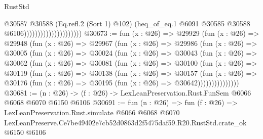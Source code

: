 \begin{lexlean}{RustStd}
\begin{coremodule}
                                          @30587
                                            @30588
                                            (Eq.refl.{2} (Sort 1) @102)
                                            (heq_of_eq.{1}
                                              @6091
                                              @30585
                                              @30588
                                              @6106)))))))))))))))))))))
@30673 := fun (x : @26) =>
  @29929
    (fun (x : @26) =>
    @29948
      (fun (x : @26) =>
      @29967
        (fun (x : @26) =>
        @29986
          (fun (x : @26) =>
          @30005
            (fun (x : @26) =>
            @30024
              (fun (x : @26) =>
              @30043
                (fun (x : @26) =>
                @30062
                  (fun (x : @26) =>
                  @30081
                    (fun (x : @26) =>
                    @30100
                      (fun (x : @26) =>
                      @30119
                        (fun (x : @26) =>
                        @30138
                          (fun (x : @26) =>
                          @30157
                            (fun (x : @26) =>
                            @30176 (fun (x : @26) => @30195 (fun (x : @26) => @30642)))))))))))))))
@30681 := (n : @26) -> (f : @26) -> LexLeanPreservation.Rust.FunSem @6066 @6068 @6070 @6150 @6106
@30691 := fun (n : @26) =>
  fun (f : @26) =>
  LexLeanPreservation.Rust.simulate
    @6066
    @6068
    @6070
    LexLeanPreserve.Ce7be49402e7cb52d0863d2f5475daf59.R20.RustStd.crate_ok
    @6150
    @6106
\end{coremodule}
\end{lexlean}
